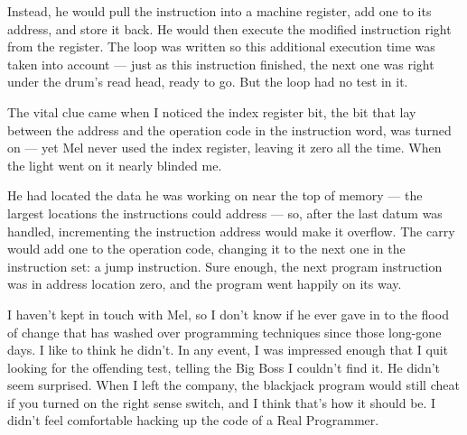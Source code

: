 \documentclass[12pt]{article}
\begin{document}
\bigskip
Instead, he would pull the instruction into a machine
register, add one to its address, and store it back. He
would then execute the modified instruction right from the
register. The loop was written so this additional execution
time was taken into account --- just as this instruction
finished, the next one was right under the drum's read head,
ready to go. But the loop had no test in it.

\bigskip
The vital clue came when I noticed the index register bit,
the bit that lay between the address and the operation code
in the instruction word, was turned on --- yet Mel never used
the index register, leaving it zero all the time. When the
light went on it nearly blinded me.

\bigskip
He had located the data he was working on near the top of
memory --- the largest locations the instructions could
address --- so, after the last datum was handled,
incrementing the instruction address would make it overflow.
The carry would add one to the operation code, changing it
to the next one in the instruction set: a jump instruction.
Sure enough, the next program instruction was in address
location zero, and the program went happily on its way.

\bigskip
I haven't kept in touch with Mel, so I don't know if he ever
gave in to the flood of change that has washed over
programming techniques since those long-gone days. I like
to think he didn't. In any event, I was impressed enough
that I quit looking for the offending test, telling the Big
Boss I couldn't find it. He didn't seem surprised. When I
left the company, the blackjack program would still cheat if
you turned on the right sense switch, and I think that's how
it should be. I didn't feel comfortable hacking up the code
of a Real Programmer.
\end{document}
